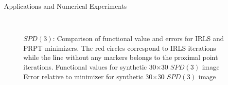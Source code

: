 \begin{chapter}{Applications and Numerical Experiments}
\begin{figure}[h!]
    \centering
    \\
    \caption[Comparison IRLS \& PRPT for Euclidean $SPD(3)$]{$SPD(3)$: Comparison of functional value and errors for IRLS and PRPT minimizers.
	The red circles correspond to IRLS iterations while the line without any markers belongs to the proximal point iterations.
	 Functional values for synthetic 30$\times$30 $SPD(3)$ image
	  Error relative to minimizer for synthetic 30$\times$30 $SPD(3)$ image
	\label{fig:comparison_spd}
    }
\end{figure}


\FloatBarrier

\end{chapter}
